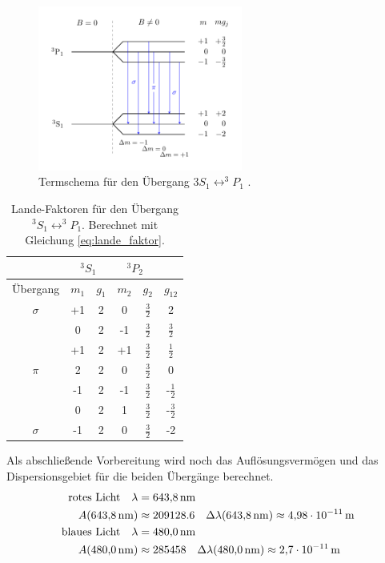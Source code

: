 \FloatBarrier
\begin{figure}[h]
  \centering
  \includegraphics[width=0.6\textwidth]{pics/termschema_blau.pdf}
  \caption{Termschema für den Übergang $3S_1\leftrightarrow ^3\!\!P_1$ \cite{luckyjosh}.}
  \label{fig: termschema_blau}
\end{figure}
\FloatBarrier

\FloatBarrier
\begin{table}

  \caption{Lande-Faktoren für den Übergang $^3S_1\leftrightarrow ^3\!\!P_1$. Berechnet mit Gleichung \eqref{eq:lande_faktor}.}
	\label{tab:Lande_blau}
	\centering
  \renewcommand{\arraystretch}{1.2}
  \begin{tabular}{cccccc}
		\toprule
    & \multicolumn{2}{c}{${}^3S_1$}  & \multicolumn{2}{c}{${}^3P_2$} \\
		\midrule
    Übergang & $m_1$  & $g_{1}$ & $m_2$ & $ g_2$ & $g_{12}$\\
		\midrule
		$\sigma$ & +1 & 2 & 0 & $\frac{3}{2}$& 2\\
		& 0 & 2 & -1 & $\frac{3}{2}$ & $\frac{3}{2}$\\
		\midrule
		& +1 & 2 & +1 & $\frac{3}{2}$ & $\frac{1}{2}$\\
		$\pi$ & 2 & 2 & 0 & $\frac{3}{2}$ & 0 \\
		& -1 & 2 & -1 & $\frac{3}{2}$ & -$\frac{1}{2}$\\
		\midrule
		& 0 & 2 & 1 & $\frac{3}{2}$ & -$\frac{3}{2}$\\
		$\sigma$ & -1 & 2 & 0 & $\frac{3}{2}$& -2\\
		\bottomrule
	\end{tabular}
\end{table}
\FloatBarrier

Als abschließende Vorbereitung wird noch das Auflösungsvermögen und das Dispersionsgebiet
für die beiden Übergänge berechnet.
\begin{align}
\text{rotes Licht}\quad  \lambda&=\SI{643.8}{\nano\meter} \notag\\
   A(\SI{643.8}{\nano\meter})&\approx 209128.6 \quad \Delta \lambda(\SI{643.8}{\nano\meter})\approx\SI{4.98e-11}{\meter} \label{eq: auf_dis_rot} \\
\text{blaues Licht}  \quad \lambda&=\SI{480.0}{\nano\meter}\notag \\
 A(\SI{480.0}{\nano\meter})&\approx 285458 \quad \Delta \lambda(\SI{480.0}{\nano\meter})\approx \SI{2.7e-11}{\meter} \label{eq: auf_dis_blau}
\end{align}



